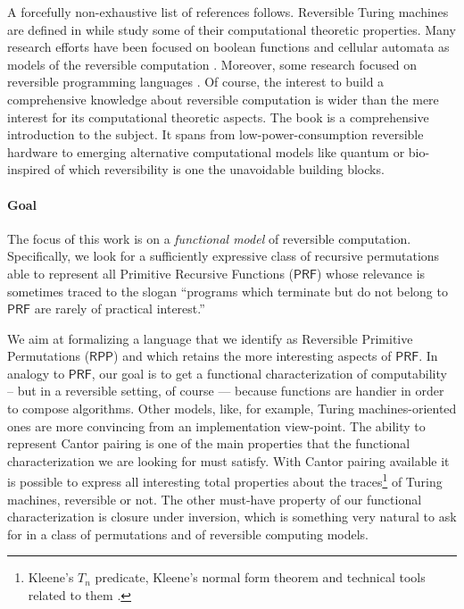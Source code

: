\documentclass[runningheads]{llncs}
\newcommand{\RPP}{\textsf{RPP}\xspace}
\newcommand{\PRF}{\textsf{PRF}\xspace}
\begin{document}
A forcefully non-exhaustive list of references follows.
Reversible Turing machines are defined in \cite{axelsen11lncs,bennett73ibm,jacopini90siam,lecerf63} while
\cite{axelsen11lncs,axelsen16acta,jacopini89tcs,li1996royal}
study some of their computational theoretic properties.
Many research efforts have been focused on  boolean functions and cellular
automata as models of the reversible
computation \cite{Morita2008101,toffoli80lncs}.
Moreover, some research focused on reversible programming languages \cite{DBLP:conf/popl/JamesS12,yokoyama08acm}.
Of course, the interest to build a comprehensive knowledge about reversible computation is wider than
the mere interest for its computational theoretic aspects.
The book \cite{perumalla2013chc} is a comprehensive
introduction to the subject. It spans from low-power-consumption reversible hardware to emerging alternative computational
models like quantum  \cite{guerriniMM15,zorzi14mscs} or bio-inspired \cite{giannini2015tcs} of which reversibility is one the unavoidable building blocks.

\paragraph{Goal}
The focus of this work is on a \emph{functional model} of reversible computation.
Specifically, we look for a  sufficiently expressive  class of recursive permutations able to represent all
Primitive Recursive Functions ($ \PRF $) \cite{rogers1967theory,soare1987book}
whose relevance is sometimes traced to the slogan
``programs which terminate but do not belong to $ \PRF $ are rarely of practical interest.''


We aim at formalizing a language that we identify as Reversible Primitive Permutations ($ \RPP $) and which
retains the more interesting aspects of $\PRF$.
In analogy to $ \PRF $, our goal is to get a functional characterization of computability
-- but in a reversible setting, of course --- because functions are handier in order to compose
algorithms. Other models, like, for example, Turing machines-oriented ones are
more convincing from an implementation view-point.
The ability to represent Cantor pairing \cite{rosenberg2009book} is one of the main properties that
the functional characterization we are looking for must satisfy.
With Cantor pairing available it is possible to express all interesting total properties about the
traces\footnote{Kleene's $T_n$ predicate, Kleene's normal form theorem and technical tools related to them \cite{cutland1980book,odifreddi1989book,soare1987book}.}
of Turing machines, reversible or not.
The other must-have property of our functional characterization is closure under inversion, which is something
very natural to ask for in a class of permutations and of reversible computing models.
\end{document}
